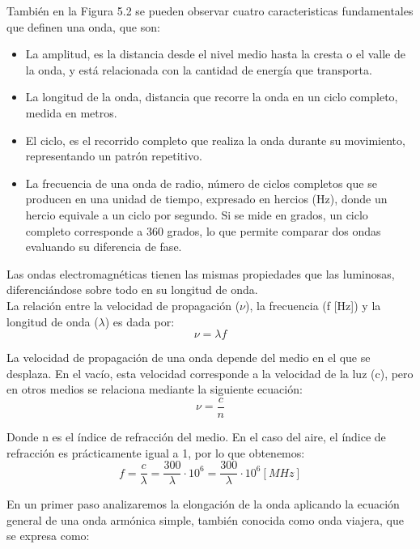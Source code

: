 También en la Figura 5.2 se pueden observar cuatro caracteristicas fundamentales que definen una onda, que son:\\
\begin{itemize}
	\item La amplitud, es la distancia desde el nivel medio hasta la cresta o el valle de la onda, y está relacionada con la cantidad de energía que transporta.
	\item La longitud de la onda, distancia que recorre la onda en un ciclo completo, medida en metros. 
	\item El ciclo, es el recorrido completo que realiza la onda durante su movimiento, representando un patrón repetitivo.
	\item La frecuencia de una onda de radio, número de ciclos completos que se producen en una unidad de tiempo, expresado en hercios (Hz), donde un hercio equivale a un ciclo por segundo. Si se mide en grados, un ciclo completo corresponde a 360 grados, lo que permite comparar dos ondas evaluando su diferencia de fase.\\
\end{itemize}

Las ondas electromagnéticas tienen las mismas propiedades que las luminosas, diferenciándose sobre todo en su longitud de onda.\\

La relación entre la velocidad de propagación (\(\nu\)), la frecuencia (f [Hz]) y la longitud de onda (\(\lambda\)) es dada por:
\begin{equation}
	\nu = \lambda f
\end{equation}

La velocidad de propagación de una onda depende del medio en el que se desplaza. En el vacío, esta velocidad corresponde a la velocidad de la luz (c), pero en otros medios se relaciona mediante la siguiente ecuación:
\begin{equation}
	\nu =\frac{c}{n}
\end{equation}

Donde n es el índice de refracción del medio. En el caso del aire, el índice de refracción es prácticamente igual a 1, por lo que obtenemos:
\[
f = \frac{c}{\lambda} = \frac{300}{\lambda} \cdot 10^{6} = \frac{300}{\lambda} \cdot 10^{6} [MHz]
\]

En un primer paso analizaremos la elongación de la onda aplicando la ecuación general de una onda armónica simple, también conocida como onda viajera, que se expresa como:\\

